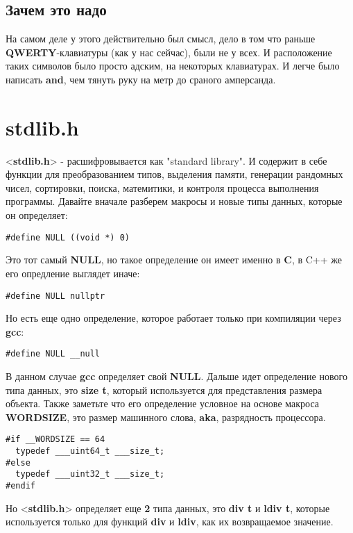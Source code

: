 \documentclass[12pt, letterpaper]{article}
\begin{document}
\subsection{Зачем это надо}
На самом деле у этого действительно был смысл, дело в том что раньше \textbf{QWERTY}-клавиатуры (как у нас сейчас), были не у всех.
И расположение таких символов было просто адским, на некоторых клавиатурах. И легче было написать \textbf{and}, чем тянуть руку
на метр до сраного амперсанда.

\section{stdlib.h}
<\textbf{stdlib.h}> - расшифровывается как "standard library".
И содержит в себе функции для преобразованием типов, выделения памяти, генерации рандомных чисел, сортировки, поиска,
матемитики, и контроля процесса выполнения программы.
\newline
\newline
Давайте вначале разберем макросы и новые типы данных, которые он определяет:
\begin{lstlisting}
#define NULL ((void *) 0)
\end{lstlisting}
Это тот самый \textbf{NULL}, но такое определение он имеет именно в \textbf{C}, в C++ же его опредление выглядет иначе:
\begin{lstlisting}
#define NULL nullptr
\end{lstlisting}
Но есть еще одно определение, которое работает только при компиляции через \textbf{gcc}:
\begin{lstlisting}
#define NULL __null
\end{lstlisting}
В данном случае \textbf{gcc} определяет свой \textbf{NULL}.
\newline
\newline
Дальше идет определение нового типа данных, это \textbf{size t}, который используется для представления размера объекта.
Также заметьте что его определение условное на основе макроса \textbf{WORDSIZE}, это размер машинного слова, \textbf{aka}, разрядность процессора.

\begin{lstlisting}
#if __WORDSIZE == 64
  typedef ___uint64_t ___size_t;
#else
  typedef ___uint32_t ___size_t;
#endif
\end{lstlisting}

Но <\textbf{stdlib.h}> определяет еще \textbf{2} типа данных, это \textbf{div t} и \textbf{ldiv t}, которые используется только для
функций \textbf{div} и \textbf{ldiv}, как их возвращаемое значение.
\end{document}
